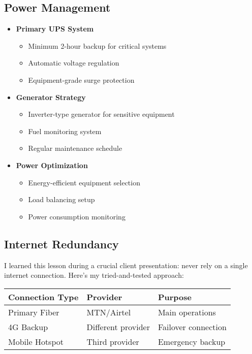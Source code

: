 \subsection{Power Management}\label{subsec:power-management}
\begin{tcolorbox}[colback=white,colframe=primarydark,title=\textbf{Power Setup Essentials}]
\begin{itemize}
    \item \textbf{Primary UPS System}
    \begin{itemize}
        \item Minimum 2-hour backup for critical systems
        \item Automatic voltage regulation
        \item Equipment-grade surge protection
    \end{itemize}

    \item \textbf{Generator Strategy}
    \begin{itemize}
        \item Inverter-type generator for sensitive equipment
        \item Fuel monitoring system
        \item Regular maintenance schedule
    \end{itemize}

    \item \textbf{Power Optimization}
    \begin{itemize}
        \item Energy-efficient equipment selection
        \item Load balancing setup
        \item Power consumption monitoring
    \end{itemize}
\end{itemize}
\end{tcolorbox}

\subsection{Internet Redundancy}\label{subsec:internet-redundancy}
I learned this lesson during a crucial client presentation: never rely on a single internet connection. Here's my tried-and-tested approach:

\begin{center}
\begin{tabularx}{\textwidth}{>{\raggedright\arraybackslash}X >{\centering\arraybackslash}X >{\raggedright\arraybackslash}X}
    \toprule
    \textbf{Connection Type} & \textbf{Provider} & \textbf{Purpose} \\
    \midrule
    Primary Fiber & MTN/Airtel & Main operations \\
    4G Backup & Different provider & Failover connection \\
    Mobile Hotspot & Third provider & Emergency backup \\
    \bottomrule
\end{tabularx}
\end{center}

